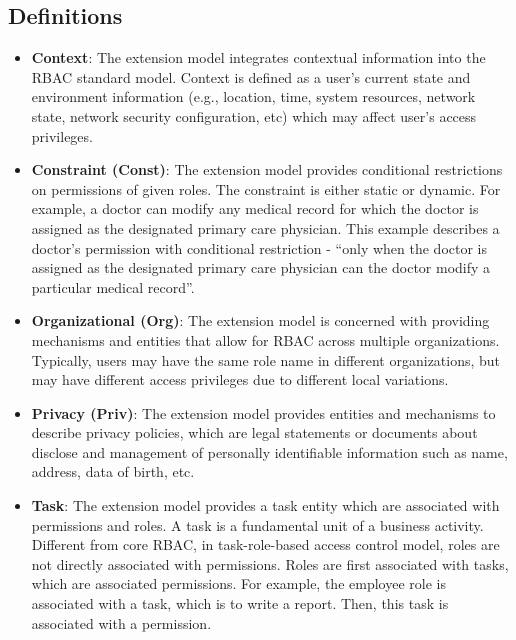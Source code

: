 \subsection{Definitions}

\begin{itemize}

  \item \textbf{Context}: The extension model integrates contextual information into the RBAC standard model. Context is defined as a user's current state and environment information (e.g., location, time, system resources, network state, network security configuration, etc) which may affect user's access privileges.

  \item \textbf{Constraint (Const)}: The extension model provides conditional restrictions on permissions of given roles. The constraint is either static or dynamic. For example, a doctor can modify any medical record for which the doctor is assigned as the designated primary care physician. This example describes a doctor's permission with conditional restriction - ``only when the doctor is assigned as the designated primary care physician can the doctor modify a particular medical record''.

  \item \textbf{Organizational (Org)}: The extension model is concerned with providing mechanisms and entities that allow for RBAC across multiple organizations. Typically, users may have the same role name in different organizations, but may have different access privileges due to different local variations.
  
  \item \textbf{Privacy (Priv)}: The extension model provides entities and mechanisms to describe privacy policies, which are legal statements or documents about disclose and management of personally identifiable information such as name, address, data of birth, etc.
  
  \item \textbf{Task}: The extension model provides a task entity which are associated with permissions and roles. A task is a fundamental unit of a business activity. Different from core RBAC, in task-role-based access control model, roles are not directly associated with permissions. Roles are first associated with tasks, which are associated permissions. For example, the employee role is associated with a task, which is to write a report. Then, this task is associated with a permission.


\end{itemize}
